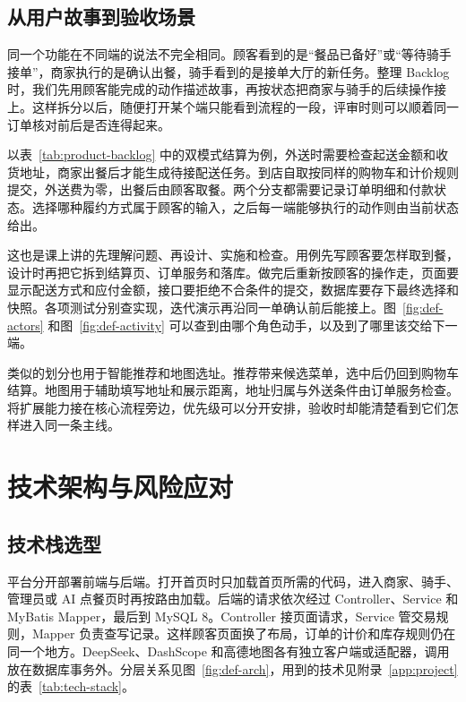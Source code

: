 \subsection{从用户故事到验收场景}

同一个功能在不同端的说法不完全相同。顾客看到的是“餐品已备好”或“等待骑手接单”，商家执行的是确认出餐，骑手看到的是接单大厅的新任务。整理 Backlog 时，我们先用顾客能完成的动作描述故事，再按状态把商家与骑手的后续操作接上。这样拆分以后，随便打开某个端只能看到流程的一段，评审时则可以顺着同一订单核对前后是否连得起来。

以表~\ref{tab:product-backlog} 中的双模式结算为例，外送时需要检查起送金额和收货地址，商家出餐后才能生成待接配送任务。到店自取按同样的购物车和计价规则提交，外送费为零，出餐后由顾客取餐。两个分支都需要记录订单明细和付款状态。选择哪种履约方式属于顾客的输入，之后每一端能够执行的动作则由当前状态给出。

这也是课上讲的先理解问题、再设计、实施和检查。用例先写顾客要怎样取到餐，设计时再把它拆到结算页、订单服务和落库。做完后重新按顾客的操作走，页面要显示配送方式和应付金额，接口要拒绝不合条件的提交，数据库要存下最终选择和快照。各项测试分别查实现，迭代演示再沿同一单确认前后能接上。图~\ref{fig:def-actors} 和图~\ref{fig:def-activity} 可以查到由哪个角色动手，以及到了哪里该交给下一端。

类似的划分也用于智能推荐和地图选址。推荐带来候选菜单，选中后仍回到购物车结算。地图用于辅助填写地址和展示距离，地址归属与外送条件由订单服务检查。将扩展能力接在核心流程旁边，优先级可以分开安排，验收时却能清楚看到它们怎样进入同一条主线。

\section{技术架构与风险应对}

\subsection{技术栈选型}

平台分开部署前端与后端。打开首页时只加载首页所需的代码，进入商家、骑手、管理员或 AI 点餐页时再按路由加载。后端的请求依次经过 Controller、Service 和 MyBatis Mapper，最后到 MySQL 8。Controller 接页面请求，Service 管交易规则，Mapper 负责查写记录。这样顾客页面换了布局，订单的计价和库存规则仍在同一个地方。DeepSeek、DashScope 和高德地图各有独立客户端或适配器，调用放在数据库事务外。分层关系见图~\ref{fig:def-arch}，用到的技术见附录~\ref{app:project} 的表~\ref{tab:tech-stack}。


